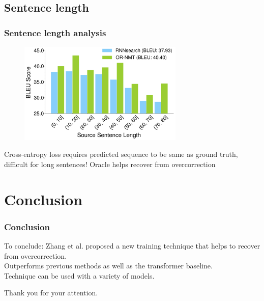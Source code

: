 \documentclass{beamer}
\begin{document}

\subsection{Sentence length}

\begin{frame}
    \frametitle{Sentence length analysis}
    \begin{figure}
        \centering
        \includegraphics[width=0.7\textwidth]{fig/length.png}
    \end{figure}
    Cross-entropy loss requires predicted sequence to be same as ground truth, difficult for long sentences! Oracle helps recover from overcorrection
\end{frame}


\section{Conclusion}

\begin{frame}
    \frametitle{Conclusion}
    To conclude: Zhang et al. proposed a new training technique that helps to recover from overcorrection.\\
    \bigskip
    Outperforms previous methods as well as the transformer baseline.\\
    \bigskip
    Technique can be used with a variety of models.
\end{frame}


\begin{frame}
    \Large{\centerline{Thank you for your attention.}}
\end{frame}

\end{document}
